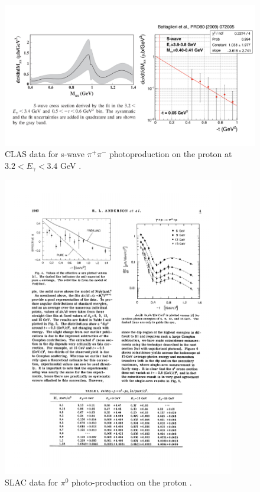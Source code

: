 \begin{figure}
\centering
\includegraphics[width=6in]{figures/f0_500.png}
\caption{CLAS data for s-wave $\pi^+ \pi^-$ photoproduction on the proton at $3.2 < E_\gamma < 3.4$ GeV \cite{Battaglieri:2009aa}. }
\label{f0_500}
\end{figure}

\begin{figure}
\centering
\includegraphics[width=4in]{figures/SLAC_data.pdf}
\caption{SLAC data for $\pi^0$ photo-production on the proton \cite{Anderson:1971}.}
\label{SLAC}
\end{figure}
